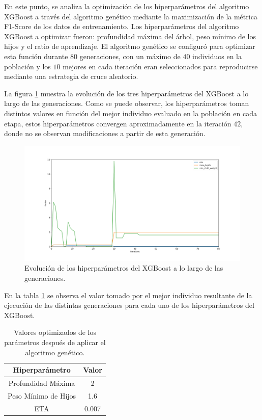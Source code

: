 En este punto, se analiza la optimización de los hiperparámetros del algoritmo XGBoost a través del algoritmo genético mediante la maximización de la métrica F1-Score de los datos de entrenamiento. Los hiperparámetros del algoritmo XGBoost a optimizar fueron: profundidad máxima del árbol, peso mínimo de los hijos y el ratio de aprendizaje. El algoritmo genético se configuró para optimizar esta función durante $80$ generaciones, con un máximo de $40$ individuos en la población y los $10$ mejores en cada iteración eran seleccionados para reproducirse mediante una estrategia de cruce aleatorio.

La figura \ref{EvolucionHiperparametrosImage} muestra la evolución de  los tres hiperparámetros del XGBoost a lo largo de las generaciones. Como se puede observar, los hiperparámetros toman distintos valores en función del mejor individuo evaluado en la población en cada etapa, estos hiperparámetros convergen aproximadamente en la iteración $42$, donde no se observan modificaciones a partir de esta generación.

\begin{figure}[H]
	\centering
	\includegraphics[width=14cm]{Figures/1stPaper/EvolutionH.png}
	\caption{Evolución de los hiperparámetros del XGBoost a lo largo de las generaciones.}
	\label{EvolucionHiperparametrosImage}
\end{figure}

En la tabla \ref{BestGASolutionTable} se observa el valor tomado por el mejor individuo resultante de la ejecución de las distintas generaciones para cada uno de los hiperparámetros del XGBoost. 

\begin{table}[h]
	\centering
	\begin{tabular}{ |c|c| } 
		\hline
		\textbf{Hiperparámetro} & \textbf{Valor}\\
		\hline
		Profundidad Máxima & 2 \\
		Peso Mínimo de Hijos & 1.6 \\ 
		ETA & 0.007 \\
		\hline
	\end{tabular}
	\caption{Valores optimizados de los parámetros después de aplicar el algoritmo genético.}
	\label{BestGASolutionTable}
\end{table}

